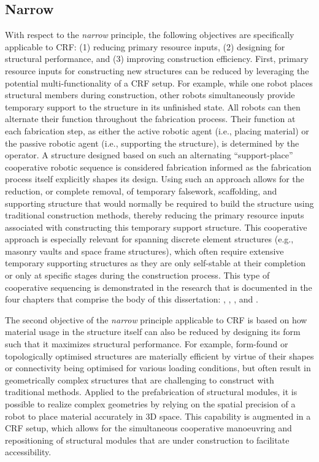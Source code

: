\subsection{Narrow}\label{sec:03_01_narrow}
    With respect to the \textit{narrow} principle, the following objectives are specifically applicable to CRF: (1) reducing primary resource inputs, (2) designing for structural performance, and (3) improving construction efficiency. First, primary resource inputs for constructing new structures can be reduced by leveraging the potential multi-functionality of a CRF setup. For example, while one robot places structural members during construction, other robots simultaneously provide temporary support to the structure in its unfinished state. All robots can then alternate their function throughout the fabrication process. Their function at each fabrication step, as either the active robotic agent (i.e., placing material) or the passive robotic agent (i.e., supporting the structure), is determined by the operator. A structure designed based on such an alternating ``support-place'' cooperative robotic sequence is considered fabrication informed as the fabrication process itself explicitly shapes its design. Using such an approach allows for the reduction, or complete removal, of temporary falsework, scaffolding, and supporting structure that would normally be required to build the structure using traditional construction methods, thereby reducing the primary resource inputs associated with constructing this temporary support structure. This cooperative approach is especially relevant for spanning discrete element structures (e.g., masonry vaults and space frame structures), which often require extensive temporary supporting structures as they are only self-stable at their completion or only at specific stages during the construction process. This type of cooperative sequencing is demonstrated in the research that is documented in the four chapters that comprise the body of this dissertation: \citep{bruun_humanrobot_2020},  \citep{parascho_robotic_2020,bruun_three_2021},  \citep{bruun_structural_2022}, and  \citep{bruun_zerowaste_2022,bruun_zerowaste_2024}.

    The second objective of the \textit{narrow} principle applicable to CRF is based on how material usage in the structure itself can also be reduced by designing its form such that it maximizes structural performance. For example, form-found or topologically optimised structures are materially efficient by virtue of their shapes or connectivity being optimised for various loading conditions, but often result in geometrically complex structures that are challenging to construct with traditional methods. Applied to the prefabrication of structural modules, it is possible to realize complex geometries by relying on the spatial precision of a robot to place material accurately in 3D space. This capability is augmented in a CRF setup, which allows for the simultaneous cooperative manoeuvring and repositioning of structural modules that are under construction to facilitate accessibility.
    
